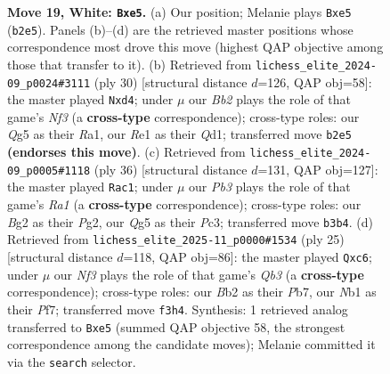 \documentclass[11pt]{article}
\begin{document}
\begin{figure}[p]
\caption{\textbf{Move 19, White: \texttt{Bxe5}.} (a) Our position; Melanie plays \texttt{Bxe5} (\texttt{b2e5}). Panels (b)--(d) are the retrieved master positions whose correspondence most drove this move (highest QAP objective among those that transfer to it). (b) Retrieved from \texttt{lichess\_elite\_2024-09\_p0024\#3111} (ply 30) [structural distance $d$=126, QAP obj=58]: the master played \texttt{Nxd4}; under $\mu$ our \emph{Bb2} plays the role of that game's \emph{Nf3} (a \textbf{cross-type} correspondence); cross-type roles: our \emph{Q}g5 as their \emph{R}a1, our \emph{R}e1 as their \emph{Q}d1; transferred move \texttt{b2e5} \textbf{(endorses this move)}. (c) Retrieved from \texttt{lichess\_elite\_2024-09\_p0005\#1118} (ply 36) [structural distance $d$=131, QAP obj=127]: the master played \texttt{Rac1}; under $\mu$ our \emph{Pb3} plays the role of that game's \emph{Ra1} (a \textbf{cross-type} correspondence); cross-type roles: our \emph{B}g2 as their \emph{P}g2, our \emph{Q}g5 as their \emph{P}c3; transferred move \texttt{b3b4}. (d) Retrieved from \texttt{lichess\_elite\_2025-11\_p0000\#1534} (ply 25) [structural distance $d$=118, QAP obj=86]: the master played \texttt{Qxc6}; under $\mu$ our \emph{Nf3} plays the role of that game's \emph{Qb3} (a \textbf{cross-type} correspondence); cross-type roles: our \emph{B}b2 as their \emph{P}b7, our \emph{N}b1 as their \emph{P}f7; transferred move \texttt{f3h4}. Synthesis: 1 retrieved analog transferred to \texttt{Bxe5} (summed QAP objective 58, the strongest correspondence among the candidate moves); Melanie committed it via the \texttt{search} selector.}
\label{fig:thought-m36}
\end{figure}

\clearpage
\end{document}
